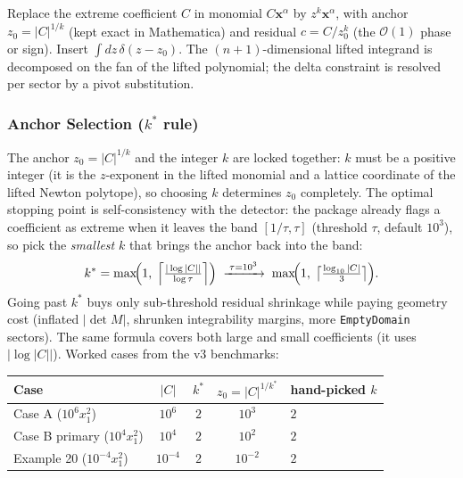 \documentclass[11pt,a4paper]{article}
\begin{document}
Replace the extreme coefficient $C$ in monomial $C\mathbf{x}^\alpha$ by $z^k\mathbf{x}^\alpha$, with anchor $z_0=|C|^{1/k}$ (kept exact in Mathematica) and residual $c=C/z_0^k$ (the $\mathcal{O}(1)$ phase or sign). Insert $\int dz\,\delta(z-z_0)$. The $(n{+}1)$-dimensional lifted integrand is decomposed on the fan of the lifted polynomial; the delta constraint is resolved per sector by a pivot substitution.

\subsubsection{Anchor Selection ($k^*$ rule)}\label{sec:anchor}

The anchor $z_0 = |C|^{1/k}$ and the integer $k$ are locked together: $k$ must be a positive integer (it is the $z$-exponent in the lifted monomial and a lattice coordinate of the lifted Newton polytope), so choosing $k$ determines $z_0$ completely. The optimal stopping point is self-consistency with the detector: the package already flags a coefficient as extreme when it leaves the band $[1/\tau,\tau]$ (threshold $\tau$, default $10^3$), so pick the \emph{smallest} $k$ that brings the anchor back into the band:
\begin{equation}\label{eq:kstar}
  k^{*} = \max\!\Bigl(1,\;\Bigl\lceil\tfrac{|\log|C||}{\log\tau}\Bigr\rceil\Bigr)
  \;\xrightarrow{\;\tau=10^3\;}\; \max\!\Bigl(1,\;\bigl\lceil\tfrac{\log_{10}|C|}{3}\bigr\rceil\Bigr).
\end{equation}
Going past $k^{*}$ buys only sub-threshold residual shrinkage while paying geometry cost (inflated $|\det M|$, shrunken integrability margins, more \texttt{EmptyDomain} sectors). The same formula covers both large and small coefficients (it uses $|\log|C||$). Worked cases from the v3 benchmarks:

\begin{center}\small
\begin{tabular}{lcccl}
\toprule
Case & $|C|$ & $k^{*}$ & $z_0=|C|^{1/k^{*}}$ & hand-picked $k$ \\
\midrule
Case A ($10^6 x_1^2$) & $10^6$ & $2$ & $10^3$ & $2$ \\
Case B primary ($10^4 x_1^2$) & $10^4$ & $2$ & $10^2$ & $2$ \\
Example 20 ($10^{-4} x_1^2$) & $10^{-4}$ & $2$ & $10^{-2}$ & $2$ \\
\bottomrule
\end{tabular}
\end{center}
\end{document}
